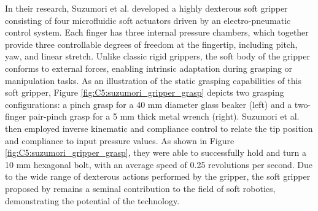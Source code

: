 In their research, Suzumori et al. developed a highly dexterous soft gripper consisting of four microfluidic soft actuators driven by an electro-pneumatic control system. Each finger has three internal pressure chambers, which together provide three controllable degrees of freedom at the fingertip, including pitch, yaw, and linear stretch. Unlike classic rigid grippers, the soft body of the gripper conforms to external forces, enabling intrinsic adaptation during grasping or manipulation tasks. As an illustration of the static grasping capabilities of this soft gripper, Figure \ref{fig:C5:suzumori_gripper_grasp} depicts two grasping configurations: a pinch grasp for a 40 \si{\milli \meter} diameter glass beaker (left) and a two-finger pair-pinch grasp for a 5 \si{\milli \meter} thick metal wrench (right). Suzumori et al. then employed inverse kinematic and compliance control to relate the tip position and compliance to input pressure values. As shown in Figure \ref{fig:C5:suzumori_gripper_grasp}, they were able to successfully hold and turn a 10 \si{\milli \meter} hexagonal bolt, with an average speed of 0.25 revolutions per second. Due to the wide range of dexterous actions performed by the gripper, the soft gripper proposed by \cite{Suzumori1991,Suzumori1992} remains a seminal contribution to the field of soft robotics, demonstrating the potential of the technology.
%
